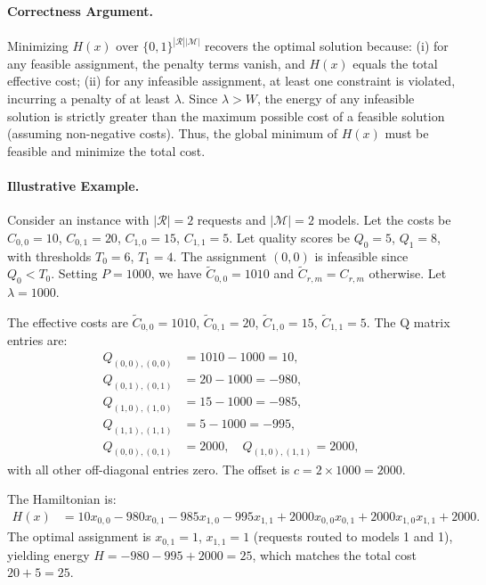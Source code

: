 \documentclass[12pt]{article}
\begin{document}
\paragraph{Correctness Argument.}
Minimizing $H(x)$ over $\{0,1\}^{|\mathcal{R}||\mathcal{M}|}$ recovers the optimal solution because: (i) for any feasible assignment, the penalty terms vanish, and $H(x)$ equals the total effective cost; (ii) for any infeasible assignment, at least one constraint is violated, incurring a penalty of at least $\lambda$. Since $\lambda > W$, the energy of any infeasible solution is strictly greater than the maximum possible cost of a feasible solution (assuming non-negative costs). Thus, the global minimum of $H(x)$ must be feasible and minimize the total cost.

\paragraph{Illustrative Example.}
Consider an instance with $|\mathcal{R}|=2$ requests and $|\mathcal{M}|=2$ models. Let the costs be $C_{0,0}=10$, $C_{0,1}=20$, $C_{1,0}=15$, $C_{1,1}=5$. Let quality scores be $Q_0=5$, $Q_1=8$, with thresholds $T_0=6$, $T_1=4$. The assignment $(0,0)$ is infeasible since $Q_0 < T_0$. Setting $P=1000$, we have $\tilde{C}_{0,0}=1010$ and $\tilde{C}_{r,m}=C_{r,m}$ otherwise. Let $\lambda=1000$.

The effective costs are $\tilde{C}_{0,0}=1010$, $\tilde{C}_{0,1}=20$, $\tilde{C}_{1,0}=15$, $\tilde{C}_{1,1}=5$. The Q matrix entries are:
\begin{align}
Q_{(0,0),(0,0)} &= 1010 - 1000 = 10, \\
Q_{(0,1),(0,1)} &= 20 - 1000 = -980, \\
Q_{(1,0),(1,0)} &= 15 - 1000 = -985, \\
Q_{(1,1),(1,1)} &= 5 - 1000 = -995, \\
Q_{(0,0),(0,1)} &= 2000, \quad Q_{(1,0),(1,1)} = 2000,
\end{align}
with all other off-diagonal entries zero. The offset is $c = 2 \times 1000 = 2000$.

The Hamiltonian is:
\begin{align}
H(x) &= 10 x_{0,0} - 980 x_{0,1} - 985 x_{1,0} - 995 x_{1,1} + 2000 x_{0,0} x_{0,1} + 2000 x_{1,0} x_{1,1} + 2000.
\end{align}
The optimal assignment is $x_{0,1}=1$, $x_{1,1}=1$ (requests routed to models 1 and 1), yielding energy $H = -980 - 995 + 2000 = 25$, which matches the total cost $20+5=25$.
\end{document}
